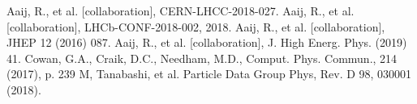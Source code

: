 \documentclass{appolb}
\begin{document}
\begin{thebibliography}{3}
Aaij, R., et al. [\lhcb collaboration], CERN-LHCC-2018-027.
Aaij, R., et al. [\lhcb collaboration],  LHCb-CONF-2018-002, 2018.
Aaij, R., et al. [\lhcb collaboration], JHEP 12 (2016) 087.
Aaij, R., et al. [\lhcb collaboration], J. High Energ. Phys. (2019) 41. 
Cowan, G.A., Craik, D.C., Needham, M.D., Comput. Phys. Commun., 214 (2017), p. 239
M, Tanabashi, et al. Particle Data Group Phys, Rev. D 98, 030001 (2018). 
\end{thebibliography}
\end{document}
